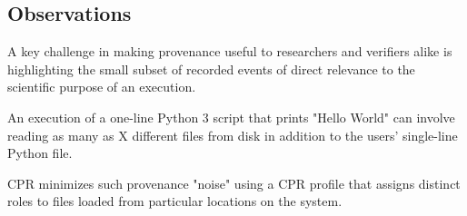 \subsection{Observations}

A key challenge in making provenance useful to researchers and verifiers alike is highlighting the small subset of recorded events of direct relevance to the scientific purpose of an execution.

An execution of a one-line Python 3 script that prints "Hello World" can involve reading as many as X different files from disk in addition to the users' single-line Python file.
 
CPR minimizes such provenance "noise" using a CPR profile that assigns distinct roles to files loaded from particular locations on the system.
